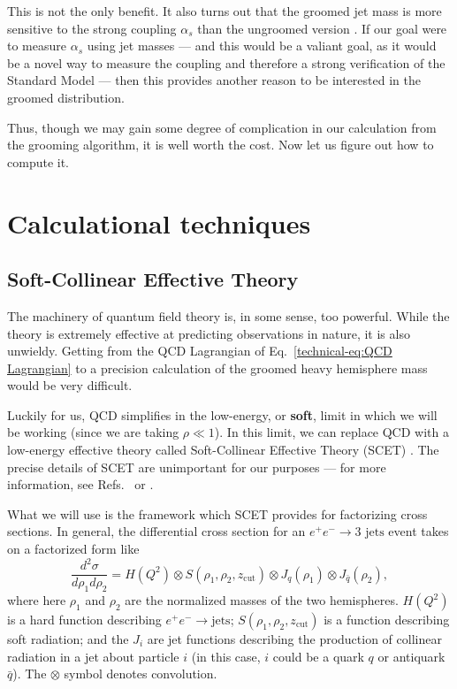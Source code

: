 \documentclass[../thesis.tex]{subfiles}
\providecommand{\zcut}{z_{\mathrm{cut}}}
\begin{document}
	This is not the only benefit. It also turns out that the groomed jet mass is more sensitive to the strong coupling $\alpha_s$ than the ungroomed version \cite{larkoski_improving_2020}. If our goal were to measure $\alpha_s$ using jet masses --- and this would be a valiant goal, as it would be a novel way to measure the coupling and therefore a strong verification of the Standard Model --- then this provides another reason to be interested in the groomed distribution.

	Thus, though we may gain some degree of complication in our calculation from the grooming algorithm, it is well worth the cost. Now let us figure out how to compute it.


\section{Calculational techniques}
\subsection{Soft-Collinear Effective Theory}
	The machinery of quantum field theory is, in some sense, too powerful. While the theory is extremely effective at predicting observations in nature, it is also unwieldy. Getting from the QCD Lagrangian of Eq.~\ref{technical-eq:QCD Lagrangian} to a precision calculation of the groomed heavy hemisphere mass would be very difficult.

	Luckily for us, QCD simplifies in the low-energy, or \textbf{soft}, limit in which we will be working (since we are taking $\rho \ll 1$). In this limit, we can replace QCD with a low-energy effective theory called Soft-Collinear Effective Theory (SCET) \cite{bauer_summing_2000,bauer_effective_2001,bauer_invariant_2001,bauer_soft-collinear_2002,beneke_soft-collinear_2002,beneke_multipole-expanded_2003,hill_spectator_2003}. The precise details of SCET are unimportant for our purposes --- for more information, see Refs.~\cite{schwartz_quantum_2014} or \cite{becher_introduction_2015-1}.

	What we will use is the framework which SCET provides for factorizing cross sections. In general, the differential cross section for an $e^+ e^- \to \text{3 jets}$ event takes on a factorized form like \cite{ellis_jet_2010,frye_factorization_2016}
	\begin{equation}
		\frac{d^2\sigma}{d\rho_1 d\rho_2} = H(Q^2) \otimes S(\rho_1, \rho_2, \zcut) \otimes J_q(\rho_1) \otimes J_{\bar q}(\rho_2),
	\end{equation} 
	where here $\rho_1$ and $\rho_2$ are the normalized masses of the two hemispheres. $H(Q^2)$ is a hard function describing $e^+ e^- \to \text{jets}$; $S(\rho_1, \rho_2, \zcut)$ is a function describing soft radiation; and the $J_i$ are jet functions describing the production of collinear radiation in a jet about particle $i$ (in this case, $i$ could be a quark $q$ or antiquark $\bar q$). The $\otimes$ symbol denotes convolution.
\end{document}
